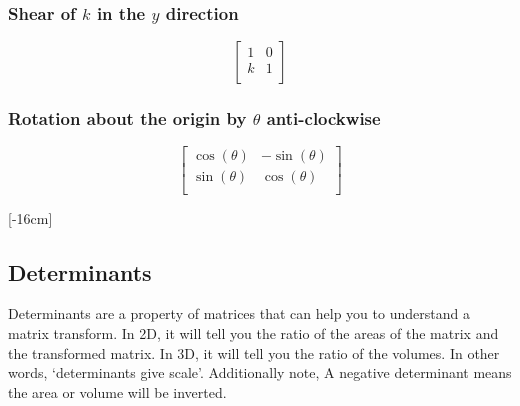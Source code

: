 \documentclass[12pt] {article}
\begin{document}
\begin{definition}
\subsubsection*{Shear of $k$ in the $y$ direction }
\begin{equation*}
  \begin{bmatrix}
    1 & 0 \\
    k & 1 \\
  \end{bmatrix}
\end{equation*}

\subsubsection*{Rotation about the origin by $\theta$ anti-clockwise}
\begin{equation*}
  \begin{bmatrix}
    \cos(\theta) & -\sin(\theta) \\
    \sin(\theta) & \cos(\theta) \\
  \end{bmatrix}
\end{equation*}
\end{definition}

[-16cm]

\subsection*{Determinants}
Determinants are a property of matrices that can help you to understand a matrix transform.
In 2D, it will tell you the ratio of the areas of the matrix and the transformed matrix.
In 3D, it will tell you the ratio of the volumes. 
In other words, `determinants give scale'.
Additionally note, A negative determinant means the area or volume will be inverted.

\newpage
\end{document}
